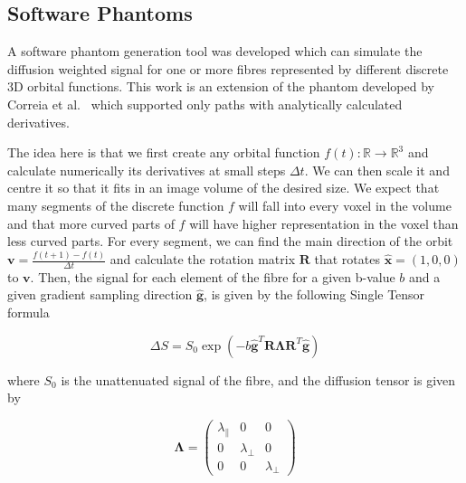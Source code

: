 \documentclass{bioinfo}
\begin{document}
\subsection{Software Phantoms\label{sub:Digital-Phantoms}}

A software phantom generation tool was developed which can simulate
the diffusion weighted signal for one or more fibres represented by
different discrete 3D orbital functions. This work is an extension
of the phantom developed by Correia et al.~\cite{Correia2009} which
supported only paths with analytically calculated derivatives.

The idea here is that we first create any orbital function $f(t):\mathbb{R}\rightarrow\mathbb{R}^{3}$
and calculate numerically its derivatives at small steps $\Delta t$.
We can then scale it and centre it so that it fits in an image volume
of the desired size. We expect that many segments of the discrete
function $f$ will fall into every voxel in the volume and that more
curved parts of $f$ will have higher representation in the voxel
than less curved parts. For every segment, we can find the main direction
of the orbit $\mathbf{v}=\frac{f(t+1)-f(t)}{\Delta t}$ and calculate
the rotation matrix $\mathbf{R}$ that rotates $\hat{\mathbf{x}}=(1,0,0)$
to $\mathbf{v}$. Then, the signal for each element of the fibre for
a given b-value $b$ and a given gradient sampling direction $\hat{\mathbf{g}}$,
is given by the following Single Tensor formula

\begin{equation}
\Delta S=S_{0}\exp(-b\hat{\mathbf{g}}^{T}\mathbf{R}\bm{\Lambda}\mathbf{R}^{T}\hat{\mathbf{g}})\label{eq:step_signal}\end{equation}


\begin{flushleft}
where \foreignlanguage{british}{$S_{0}$ is the unattenuated signal
of the fibre, and the diffusion tensor is given by}
\par\end{flushleft}

\begin{center}
\begin{equation}
\bm{\Lambda}=\left(\begin{array}{ccc}
\lambda_{\parallel} & 0 & 0\\
0 & \lambda_{\perp} & 0\\
0 & 0 & \lambda_{\perp}\end{array}\right)\label{eq:step_tensor}\end{equation}

\par\end{center}
\end{document}
